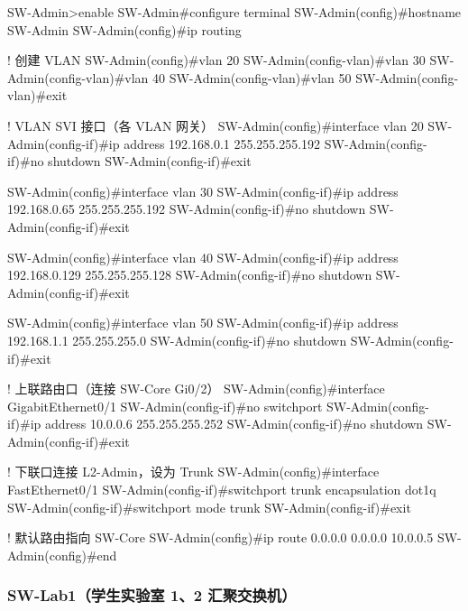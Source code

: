 \documentclass[12pt,a4paper]{ctexart}
\begin{document}
\begin{codeblock}
SW-Admin>enable
SW-Admin#configure terminal
SW-Admin(config)#hostname SW-Admin
SW-Admin(config)#ip routing

! 创建 VLAN
SW-Admin(config)#vlan 20
SW-Admin(config-vlan)#vlan 30
SW-Admin(config-vlan)#vlan 40
SW-Admin(config-vlan)#vlan 50
SW-Admin(config-vlan)#exit

! VLAN SVI 接口（各 VLAN 网关）
SW-Admin(config)#interface vlan 20
SW-Admin(config-if)#ip address 192.168.0.1 255.255.255.192
SW-Admin(config-if)#no shutdown
SW-Admin(config-if)#exit

SW-Admin(config)#interface vlan 30
SW-Admin(config-if)#ip address 192.168.0.65 255.255.255.192
SW-Admin(config-if)#no shutdown
SW-Admin(config-if)#exit

SW-Admin(config)#interface vlan 40
SW-Admin(config-if)#ip address 192.168.0.129 255.255.255.128
SW-Admin(config-if)#no shutdown
SW-Admin(config-if)#exit

SW-Admin(config)#interface vlan 50
SW-Admin(config-if)#ip address 192.168.1.1 255.255.255.0
SW-Admin(config-if)#no shutdown
SW-Admin(config-if)#exit

! 上联路由口（连接 SW-Core Gi0/2）
SW-Admin(config)#interface GigabitEthernet0/1
SW-Admin(config-if)#no switchport
SW-Admin(config-if)#ip address 10.0.0.6 255.255.255.252
SW-Admin(config-if)#no shutdown
SW-Admin(config-if)#exit

! 下联口连接 L2-Admin，设为 Trunk
SW-Admin(config)#interface FastEthernet0/1
SW-Admin(config-if)#switchport trunk encapsulation dot1q
SW-Admin(config-if)#switchport mode trunk
SW-Admin(config-if)#exit

! 默认路由指向 SW-Core
SW-Admin(config)#ip route 0.0.0.0 0.0.0.0 10.0.0.5
SW-Admin(config)#end
\end{codeblock}

\subsubsection{SW-Lab1（学生实验室 1、2 汇聚交换机）}
\end{document}

